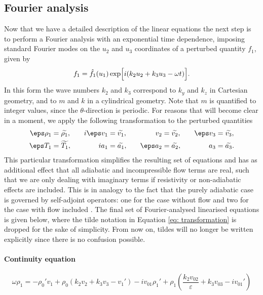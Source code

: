 \subsection{Fourier analysis} \label{ss: fourier}
Now that we have a detailed description of the linear equations the next step is to perform a Fourier analysis with an exponential time dependence, imposing standard Fourier modes on the $u_2$ and $u_3$ coordinates of a perturbed quantity $f_1$, given by
\begin{equation} \label{eq: fourier_analysis}
  f_1 = \hat{f_1}(u_1)\exp\Bigl[i(k_2 u_2 + k_3 u_3 - \omega t)\Bigr].
\end{equation}
In this form the wave numbers $k_2$ and $k_3$ correspond to $k_y$ and $k_z$ in Cartesian geometry, and to $m$ and $k$ in a cylindrical geometry. Note that $m$ is quantified to integer values, since the $\theta$-direction is periodic. For reasons that will become clear in a moment, we apply the following transformation to the perturbed quantities
\begin{equation}
  \begin{alignedat}{4} \label{eq: transformation}
    \eps \rho_1 &= \widetilde{\rho_1},
    \qquad&
    i\eps v_1 &= \widetilde{v_1},
    \qquad&
    v_2 &= \widetilde{v_2},
    \qquad&
    \eps v_3 &= \widetilde{v_3}, \\
    \eps T_1 &= \widetilde{T_1},
    &
    i a_1 &= \widetilde{a_1},
    &
    \eps a_2 &= \widetilde{a_2},
    &
    a_3 &= \widetilde{a_3}. \\
  \end{alignedat}
\end{equation}
This particular transformation simplifies the resulting set of equations and has as additional effect that all adiabatic and incompressible flow terms are real, such that we are only dealing with imaginary terms if resistivity or non-adiabatic effects are included. This is in analogy to the fact that the purely adiabatic case is governed by self-adjoint operators: one for the case without flow and two for the case with flow included \citep{goedbloed2018_web1,goedbloed2018_web2}. The final set of Fourier-analysed linearised equations is given below, where the tilde notation in Equation \eqref{eq: transformation} is dropped for the sake of simplicity. From now on, tildes will no longer be written explicitly since there is no confusion possible.

\paragraph{Continuity equation}
\begin{equation} \label{eq: full_continuity}
  \omega\rho_1 =
    -\rho_0' v_1 + \rho_0\left(k_2 v_2 + k_3 v_3 - v_1'\right)
    -i v_{01}\rho_1' + \rho_1 \left(\frac{k_2 v_{02}}{\varepsilon} + k_3 v_{03} - i v_{01}'\right)
\end{equation}

